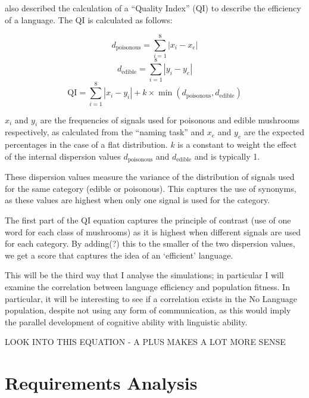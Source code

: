 \documentclass[12pt,a4paper,twoside,openright]{report}
\begin{document}
\citet{Cangelosi1998} also described the calculation of a ``Quality Index'' (QI) to describe the efficiency of a language. The QI is calculated as follows:

\begin{equation}
\label{equation:dpoisonous}
d_{\mathrm{poisonous}} = \sum^{8}_{i = 1}{|x_i - x_e|}
\end{equation}
\begin{equation}
\label{equation:dedible}
d_{\mathrm{edible}} = \sum^{8}_{i = 1}{|y_i - y_e|}
\end{equation}
\begin{equation}
\label{equation:qi}
\mathrm{QI} = \sum^{8}_{i = 1} |x_i - y_i| + k \times \min (d_{\mathrm{poisonous}}, d_{\mathrm{edible}})
\end{equation}

$x_i$ and $y_i$ are the frequencies of signals used for poisonous and edible mushrooms respectively, as calculated from the ``naming task'' and $x_e$ and $y_e$ are the expected percentages in the case of a flat distribution. $k$ is a constant to weight the effect of the internal dispersion values $d_{\mathrm{poisonous}}$ and $d_{\mathrm{edible}}$ and is typically 1.

These dispersion values measure the variance of the distribution of signals used for the same category (edible or poisonous). This captures the use of synonyms, as these values are highest when only one signal is used for the category. 

The first part of the QI equation captures the principle of contrast (use of one word for each class of mushrooms) as it is highest when different signals are used for each category. By adding(?) this to the smaller of the two dispersion values, we get a score that captures the idea of an `efficient' language.

This will be the third way that I analyse the simulations; in particular I will examine the correlation between language efficiency and population fitness. In particular, it will be interesting to see if a correlation exists in the No Language population, despite not using any form of communication, as this would imply the parallel development of cognitive ability with linguistic ability.

LOOK INTO THIS EQUATION - A PLUS MAKES A LOT MORE SENSE

\section{Requirements Analysis}\label{section:requirements}
\end{document}
